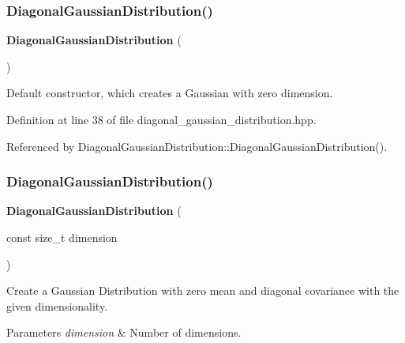 \subsubsection{Diagonal\+Gaussian\+Distribution()\hspace{0.1cm}{\footnotesize\ttfamily [1/3]}}
{\footnotesize\ttfamily \textbf{ Diagonal\+Gaussian\+Distribution} (\begin{DoxyParamCaption}{ }\end{DoxyParamCaption})\hspace{0.3cm}{\ttfamily [inline]}}



Default constructor, which creates a Gaussian with zero dimension. 



Definition at line 38 of file diagonal\+\_\+gaussian\+\_\+distribution.\+hpp.



Referenced by Diagonal\+Gaussian\+Distribution\+::\+Diagonal\+Gaussian\+Distribution().

\mbox{\label{classmlpack_1_1distribution_1_1DiagonalGaussianDistribution_a53c6049f223552c6ed646615def048c8}} 
\subsubsection{Diagonal\+Gaussian\+Distribution()\hspace{0.1cm}{\footnotesize\ttfamily [2/3]}}
{\footnotesize\ttfamily \textbf{ Diagonal\+Gaussian\+Distribution} (\begin{DoxyParamCaption}\item[{const size\+\_\+t}]{dimension }\end{DoxyParamCaption})\hspace{0.3cm}{\ttfamily [inline]}}



Create a Gaussian Distribution with zero mean and diagonal covariance with the given dimensionality. 


\begin{DoxyParams}{Parameters}
{\em dimension} & Number of dimensions. \\
\hline
\end{DoxyParams}


